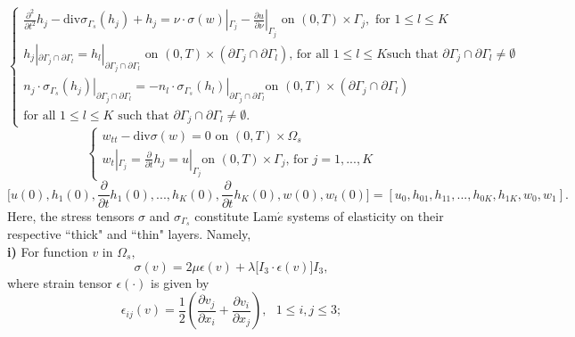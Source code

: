 \documentclass[11pt]{article}
\begin{document}
\begin{equation}
\left\{ 
\begin{array}{l}
\frac{\partial ^{2}}{\partial t^{2}}h_{j}-\text{div}\sigma _{\Gamma _{s}}(h_{j})+h_{j}=\nu \cdot \sigma (w)|_{\Gamma _{j}}-\frac{\partial u}{\partial \nu }%
|_{\Gamma _{j}}\text{ \ \ \ on \ }(0,T)\times \Gamma _{j},\text{ \ \ for  }%
1\leq l\leq K \\ 
h_{j}|_{\partial \Gamma _{j}\cap \partial \Gamma _{l}}=h_{l}|_{\partial
\Gamma _{j}\cap \partial \Gamma _{l}}\text{ on \ }(0,T)\times (\partial
\Gamma _{j}\cap \partial \Gamma _{l})\text{, for all }1\leq l\leq K\text{
such that }\partial \Gamma _{j}\cap \partial \Gamma _{l}\neq \emptyset  \\ 
\left. n_{j}\cdot \sigma _{\Gamma _{s}}(h_{j})\right\vert _{\partial \Gamma
_{j}\cap \partial \Gamma _{l}}=-\left. n_{l}\cdot \sigma _{\Gamma
_{s}}(h_{l})\right\vert _{\partial \Gamma _{j}\cap \partial \Gamma _{l}}%
\text{on \ }(0,T)\times (\partial \Gamma _{j}\cap \partial \Gamma _{l})\\
\text{for all }1\leq l\leq K\text{ such that }\partial \Gamma _{j}\cap \partial
\Gamma _{l}\neq \emptyset .\text{\ }%
\end{array}%
\right.   \label{2.5b}
\end{equation}%
\begin{equation}
\left\{ 
\begin{array}{l}
w_{tt}-\text{div}\sigma (w)=0\text{ \ \ \ on \ }(0,T)\times \Omega _{s} \\ 
w_{t}|_{\Gamma _{j}}=\frac{\partial }{\partial t}h_{j}=u|_{\Gamma _{j}}\text{
\ \ \ on \ }(0,T)\times \Gamma _{j}\text{, \ for }j=1,...,K%
\end{array}%
\right.   \label{2d}
\end{equation}%
\begin{equation}
\lbrack u(0),h_{1}(0),\frac{\partial }{\partial t}h_{1}(0),...,h_{K}(0),%
\frac{\partial }{\partial t}%
h_{K}(0),w(0),w_{t}(0)]=[u_{0},h_{01},h_{11},...,h_{0K},h_{1K},w_{0},w_{1}].
\label{IC}
\end{equation}%
Here, the stress tensors $\sigma $ and $\sigma _{\Gamma _{s}}$ constitute
Lam$\acute{e}$ systems of elasticity on their respective ``thick" and ``thin" layers.
Namely,\newline \\
\textbf{i)} For function $v$ in $\Omega _{s},$  
\[
\sigma (v)=2\mu \epsilon (v)+\lambda \lbrack I_{3}\cdot \epsilon (v)]I_{3},
\]%
where strain tensor $\epsilon (\cdot )$ is given by 
\[
\epsilon _{ij}(v)=\frac{1}{2}\left( \frac{\partial v_{j}}{\partial x_{i}}+%
\frac{\partial v_{i}}{\partial x_{j}}\right) ,\text{ \ \ }1\leq i,j\leq 3;
\]%
\end{document}
